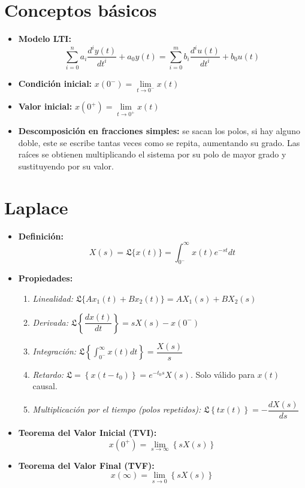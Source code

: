 \documentclass[a4paper, twocolumn, 10pt]{article}
\newlength{\du}
\begin{document}
	
\setlength{\belowdisplayskip}{0pt} \setlength{\belowdisplayshortskip}{0pt} 
\setlength{\abovedisplayskip}{0pt} \setlength{\abovedisplayshortskip}{0pt} %
	
\section{Conceptos básicos}

\begin{itemize}
	\item \textbf{Modelo LTI:} \[\sum_{i=0}^{n}a_i\dfrac{d^iy(t)}{dt^i} + a_0y(t) = \sum_{i=0}^{m}b_i\dfrac{d^iu(t)}{dt^i} + b_0u(t)\]
	\item \textbf{Condición inicial:} $x(0^-) = \lim\limits_{t\rightarrow0^-}x(t)$
	\item \textbf{Valor inicial:} $x(0^+) = \lim\limits_{t\rightarrow0^+}x(t)$
	\item \textbf{Descomposición en fracciones simples:} se sacan los polos, si hay alguno doble, este se escribe tantas veces como se repita, aumentando su grado. Las raíces se obtienen multiplicando el sistema por su polo de mayor grado y sustituyendo por su valor. 
\end{itemize}

\section{Laplace}

\begin{itemize}
	\item \textbf{Definición:} \[X(s) = \mathfrak{L}\{x(t)\} = \int_{0^-}^{\infty}x(t)e^{-st}dt\]
	\item \textbf{Propiedades:} 
	\begin{enumerate}
		\item \textit{Linealidad:} $\mathfrak{L}\{Ax_1(t) +Bx_2(t)\} = AX_1(s) + BX_2(s)$
		\item \textit{Derivada:} $\mathfrak{L}\left\{\dfrac{dx(t)}{dt}\right\} = sX(s) - x(0^-)$
		\item \textit{Integración:} $\mathfrak{L}\left\{\int_{0^-}^{\infty}x(t)dt\right\} = \dfrac{X(s)}{s}$
		\item \textit{Retardo:} $\mathfrak{L} = \left\{x(t-t_0)\right\} = e^{-t_0s}X(s)$. Solo válido para $x(t)$ causal.
		\item \textit{Multiplicación por el tiempo (polos repetidos):} $\mathfrak{L}\left\{tx(t)\right\} = -\dfrac{dX(s)}{ds}$
	\end{enumerate}
	\item \textbf{Teorema del Valor Inicial (TVI):} \[x(0^+) = \lim\limits_{s\rightarrow\infty}\left\{sX(s)\right\}\]
	\item \textbf{Teorema del Valor Final (TVF):} \[x(\infty) = \lim\limits_{s\rightarrow0}\left\{sX(s)\right\}\]
\end{itemize}
\end{document}
